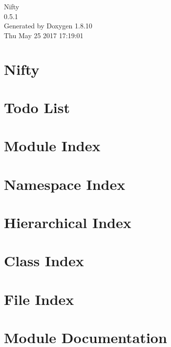 \documentclass[twoside]{book}
\newcommand{\+}{\discretionary{\mbox{\scriptsize$\hookleftarrow$}}{}{}}
\newcommand{\clearemptydoublepage}{%
  \newpage{\pagestyle{empty}\cleardoublepage}%
}
\begin{document}
\hypersetup{pageanchor=false,
             bookmarks=true,
             bookmarksnumbered=true,
             pdfencoding=unicode
            }
\begin{titlepage}
\vspace*{7cm}
\begin{center}%
{\Large Nifty \\[1ex]\large 0.\+5.\+1 }\\
\vspace*{1cm}
{\large Generated by Doxygen 1.8.10}\\
\vspace*{0.5cm}
{\small Thu May 25 2017 17:19:01}\\
\end{center}
\end{titlepage}
\clearemptydoublepage
\tableofcontents
\clearemptydoublepage
{}
\hypersetup{pageanchor=true}

\chapter{Nifty}
\label{index}\hypertarget{index}{}
\chapter{Todo List}
\label{todo}
\hypertarget{todo}{}

\chapter{Module Index}

\chapter{Namespace Index}

\chapter{Hierarchical Index}

\chapter{Class Index}

\chapter{File Index}

\chapter{Module Documentation}

\end{document}
